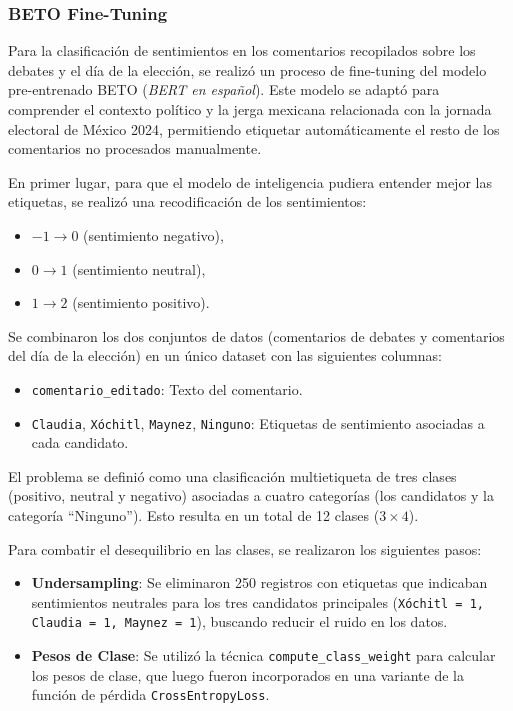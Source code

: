 \documentclass[10pt, a4paper]{article}
\begin{document}
	
	
	\subsubsection{BETO Fine-Tuning}
	
	Para la clasificación de sentimientos en los comentarios recopilados sobre los debates y el día de la elección, se realizó un proceso de fine-tuning del modelo pre-entrenado BETO (\textit{BERT en español}). Este modelo se adaptó para comprender el contexto político y la jerga mexicana relacionada con la jornada electoral de México 2024, permitiendo etiquetar automáticamente el resto de los comentarios no procesados manualmente.
	
	En primer lugar, para que el modelo de inteligencia pudiera entender mejor las etiquetas, se realizó una recodificación de los sentimientos:
	\begin{itemize}
		\item \(-1 \rightarrow 0\) (sentimiento negativo),
		\item \(0 \rightarrow 1\) (sentimiento neutral),
		\item \(1 \rightarrow 2\) (sentimiento positivo).
	\end{itemize}

	
	Se combinaron los dos conjuntos de datos (comentarios de debates y comentarios del día de la elección) en un único dataset con las siguientes columnas:
	\begin{itemize}
		\item \texttt{comentario\_editado}: Texto del comentario.
		\item \texttt{Claudia}, \texttt{Xóchitl}, \texttt{Maynez}, \texttt{Ninguno}: Etiquetas de sentimiento asociadas a cada candidato.
	\end{itemize}
	
	El problema se definió como una clasificación multietiqueta de tres clases (positivo, neutral y negativo) asociadas a cuatro categorías (los candidatos y la categoría ``Ninguno''). Esto resulta en un total de 12 clases (\(3 \times 4\)).
	
	Para combatir el desequilibrio en las clases, se realizaron los siguientes pasos:
	\begin{itemize}
		\item \textbf{Undersampling}: Se eliminaron 250 registros con etiquetas que indicaban sentimientos neutrales para los tres candidatos principales (\texttt{Xóchitl = 1, Claudia = 1, Maynez = 1}), buscando reducir el ruido en los datos.
		\item \textbf{Pesos de Clase}: Se utilizó la técnica \texttt{compute\_class\_weight} para calcular los pesos de clase, que luego fueron incorporados en una variante de la función de pérdida \texttt{CrossEntropyLoss}.
	\end{itemize}
	
\end{document}

